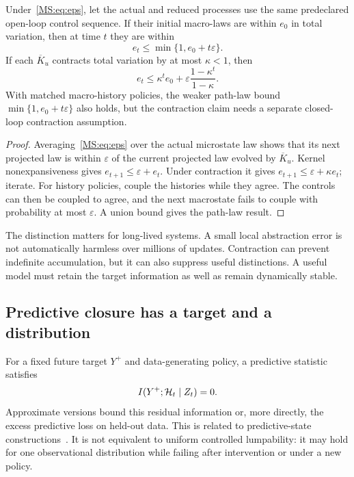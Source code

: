 \begin{MSproposition}\label{MS:prop:time}
Under~\eqref{MS:eq:eps}, let the actual and reduced processes use the same predeclared open-loop control sequence. If their initial macro-laws are within $e_0$ in total variation, then at time $t$ they are within
\[
e_t\leq\min\{1,e_0+t\varepsilon\}.
\]
If each $\overline K_u$ contracts total variation by at most $\kappa<1$, then
\begin{equation}\label{MS:eq:contract}
e_t\leq\kappa^t e_0+\varepsilon\frac{1-\kappa^t}{1-\kappa}.
\end{equation}
With matched macro-history policies, the weaker path-law bound $\min\{1,e_0+t\varepsilon\}$ also holds, but the contraction claim needs a separate closed-loop contraction assumption.
\end{MSproposition}
\begin{proof}
Averaging~\eqref{MS:eq:eps} over the actual microstate law shows that its next projected law is within $\varepsilon$ of the current projected law evolved by $\overline K_u$. Kernel nonexpansiveness gives $e_{t+1}\leq\varepsilon+e_t$. Under contraction it gives $e_{t+1}\leq\varepsilon+\kappa e_t$; iterate. For history policies, couple the histories while they agree. The controls can then be coupled to agree, and the next macrostate fails to couple with probability at most $\varepsilon$. A union bound gives the path-law result.
\end{proof}

The distinction matters for long-lived systems. A small local abstraction error is not automatically harmless over millions of updates. Contraction can prevent indefinite accumulation, but it can also suppress useful distinctions. A useful model must retain the target information as well as remain dynamically stable.

\subsection{Predictive closure has a target and a distribution}
For a fixed future target $Y^+$ and data-generating policy, a predictive statistic satisfies
\[
I(Y^+;\mathcal H_t\mid Z_t)=0.
\]
Approximate versions bound this residual information or, more directly, the excess predictive loss on held-out data. This is related to predictive-state constructions~\cite{MS:shalizi}. It is not equivalent to uniform controlled lumpability: it may hold for one observational distribution while failing after intervention or under a new policy.

